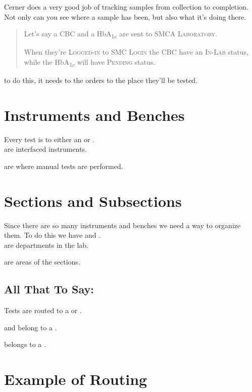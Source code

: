 Cerner does a very good job of tracking samples from collection to completion. Not only can you see where a sample has been, but also what it's doing there.

\begin{quote}
 Let's say a CBC and a HbA\textsubscript{1c} are sent to \textsc{SMCA Laboratory}.

When they're \textsc{Logged-in} to \textsc{SMC Login} the CBC have an \textsc{In-Lab} status, while the HbA\textsubscript{1c} will have \textsc{Pending} status.
\end{quote}

 to do this, it needs to  the orders to the place they'll be tested.


\section{Instruments and Benches}

Every test is  to either an  or .\\

 are interfaced instruments.

 are where manual tests are performed.

\section{Sections and Subsections}

 Since there are so many instruments and benches we need a way to organize them. To do this we have  and .\\

  are departments in the lab.

  are areas of the sections.


\subsection{All That To Say:}

Tests are routed to a  or .

\noindent
{} and  belong to a .

\noindent
{} belongs to a .

\section{Example of Routing}
{\scriptsize\scshape
}
